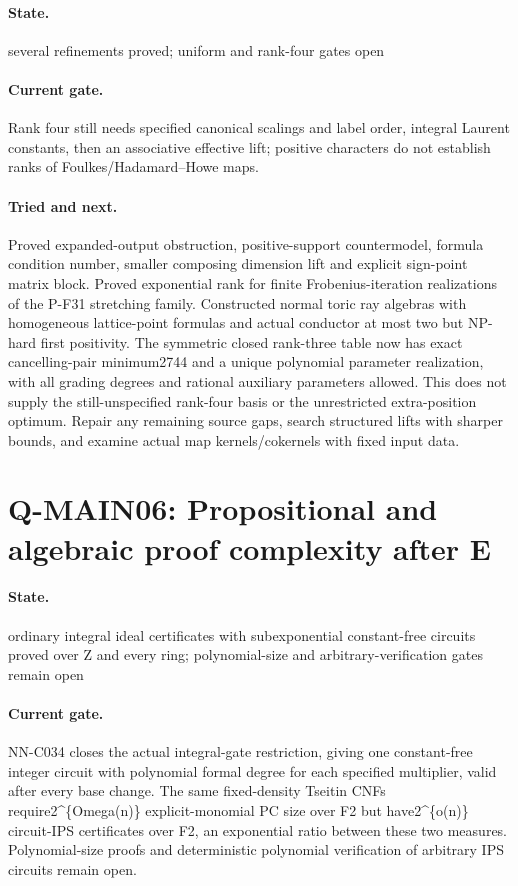 \paragraph{State.} several refinements proved; uniform and rank-four gates open
\paragraph{Current gate.} Rank four still needs specified canonical scalings and label order, integral Laurent constants, then an associative effective lift; positive characters do not establish ranks of Foulkes/Hadamard--Howe maps.
\paragraph{Tried and next.} Proved expanded-output obstruction, positive-support countermodel, formula condition number, smaller composing dimension lift and explicit sign-point matrix block. Proved exponential rank for finite Frobenius-iteration realizations of the P-F31 stretching family. Constructed normal toric ray algebras with homogeneous lattice-point formulas and actual conductor at most two but NP-hard first positivity. The symmetric closed rank-three table now has exact cancelling-pair minimum2744 and a unique polynomial parameter realization, with all grading degrees and rational auxiliary parameters allowed. This does not supply the still-unspecified rank-four basis or the unrestricted extra-position optimum. Repair any remaining source gaps, search structured lifts with sharper bounds, and examine actual map kernels/cokernels with fixed input data.

\section{Q-MAIN06: Propositional and algebraic proof complexity after E}
\paragraph{State.} ordinary integral ideal certificates with subexponential constant-free circuits proved over Z and every ring; polynomial-size and arbitrary-verification gates remain open
\paragraph{Current gate.} NN-C034 closes the actual integral-gate restriction, giving one constant-free integer circuit with polynomial formal degree for each specified multiplier, valid after every base change. The same fixed-density Tseitin CNFs require2\textasciicircum{}\{Omega(n)\} explicit-monomial PC size over F2 but have2\textasciicircum{}\{o(n)\} circuit-IPS certificates over F2, an exponential ratio between these two measures. Polynomial-size proofs and deterministic polynomial verification of arbitrary IPS circuits remain open.

